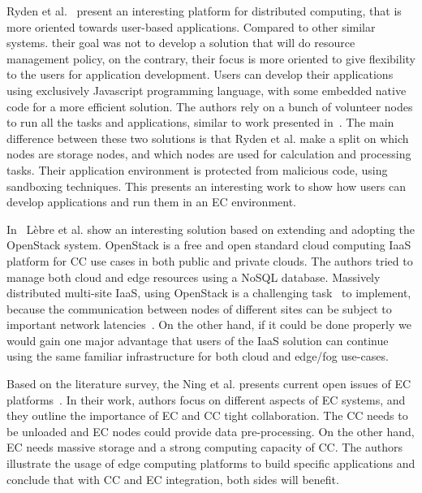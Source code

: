 Ryden et al.~\cite{RydenOCW14} present an interesting platform for distributed computing, that is more oriented towards user-based applications\label{sec:rayden}. Compared to other similar systems. their goal was not to develop a solution that will do resource management policy, on the contrary, their focus is more oriented to give flexibility to the users for application development. Users can develop their applications using exclusively Javascript programming language, with some embedded native code for a more efficient solution. The authors rely on a bunch of volunteer nodes to run all the tasks and applications, similar to work presented in~\cite{CiobanuNPDMM19}. The main difference between these two solutions is that Ryden et al. make a split on which nodes are storage nodes, and which nodes are used for calculation and processing tasks. Their application environment is protected from malicious code, using sandboxing techniques. This presents an interesting work to show how users can develop applications and run them in an EC environment.

In~\cite{LebrePSD17} L{\`{e}}bre et al. show an interesting solution based on extending and adopting the OpenStack system. OpenStack is a free and open standard cloud computing IaaS platform for CC use cases in both public and private clouds. The authors tried to manage both cloud and edge resources using a NoSQL database. Massively distributed multi-site IaaS, using OpenStack is a challenging task~\cite{LebrePSD17} to implement, because the communication between nodes of different sites can be subject to important network latencies~\cite{LebrePSD17}. On the other hand, if it could be done properly we would gain one major advantage that users of the IaaS solution can continue using the same familiar infrastructure for both cloud and edge/fog use-cases.

Based on the literature survey, the Ning et al. presents current open issues of EC platforms~\cite{NingLSY20}. In their work, authors focus on different aspects of EC systems, and they outline the importance of EC and CC tight collaboration. The CC needs to be unloaded and EC nodes could provide data pre-processing. On the other hand, EC needs massive storage and a strong computing capacity of CC. The authors illustrate the usage of edge computing platforms to build specific applications and conclude that with CC and EC integration, both sides will benefit.

